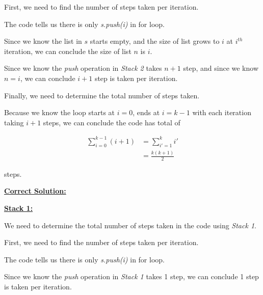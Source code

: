 \documentclass[12pt]{article}
\begin{document}
\begin{enumerate}[a.]
    \bigskip

    First, we need to find the number of steps taken per iteration.

    \bigskip

    The code tells us there is only \textit{s.push(i)} in for loop.

    \bigskip

    Since we know the list in $s$ starts empty, and the size of list grows to $i$ at $i^{th}$
    iteration, we can conclude the size of list $n$ is $i$.

    \bigskip

    Since we know the \textit{push} operation in \textit{Stack 2} takes $n+1$ step,
    and since we know $n = i$, we can conclude $i+1$ step is taken per iteration.

    \bigskip

    Finally, we need to determine the total number of steps taken.

    \bigskip

    Because we know the loop starts at $i = 0$, ends at $i = k-1$ with each iteration
    taking $i+1$ steps, we can conclude the code has total of

    \setcounter{equation}{0}
    \begin{align}
        \sum\limits_{i=0}^{k-1} (i+1) &= \sum\limits_{i'=1}^k i'\\
        &= \frac{k(k+1)}{2}
    \end{align}

    steps.

    \bigskip

    \begin{mdframed}
        \underline{\textbf{Correct Solution:}}

        \bigskip

        \underline{\textbf{Stack 1:}}

        \bigskip

        We need to determine the total number of steps taken in the code using \textit{Stack 1}.

        \bigskip

        First, we need to find the number of steps taken per iteration.

        \bigskip

        The code tells us there is only \textit{s.push(i)} in for loop.

        \bigskip

        Since we know the \textit{push} operation in \textit{Stack 1} takes 1 step,
        we can conclude 1 step is taken per iteration.


\end{mdframed}
\end{enumerate}
\end{document}
